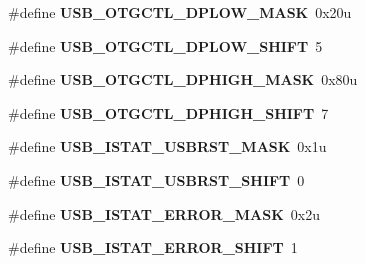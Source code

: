 \begin{DoxyCompactItemize}
\item 
\#define {\bfseries U\+S\+B\+\_\+\+O\+T\+G\+C\+T\+L\+\_\+\+D\+P\+L\+O\+W\+\_\+\+M\+A\+SK}~0x20u\hypertarget{group__USB__Register__Masks_gad6a988a0338aa5fcd511f9644b2375eb}{}\label{group__USB__Register__Masks_gad6a988a0338aa5fcd511f9644b2375eb}

\item 
\#define {\bfseries U\+S\+B\+\_\+\+O\+T\+G\+C\+T\+L\+\_\+\+D\+P\+L\+O\+W\+\_\+\+S\+H\+I\+FT}~5\hypertarget{group__USB__Register__Masks_ga94318731712f5399af57fefe46ac8cec}{}\label{group__USB__Register__Masks_ga94318731712f5399af57fefe46ac8cec}

\item 
\#define {\bfseries U\+S\+B\+\_\+\+O\+T\+G\+C\+T\+L\+\_\+\+D\+P\+H\+I\+G\+H\+\_\+\+M\+A\+SK}~0x80u\hypertarget{group__USB__Register__Masks_ga58ba9522df4e9a18c7efa0472837c30c}{}\label{group__USB__Register__Masks_ga58ba9522df4e9a18c7efa0472837c30c}

\item 
\#define {\bfseries U\+S\+B\+\_\+\+O\+T\+G\+C\+T\+L\+\_\+\+D\+P\+H\+I\+G\+H\+\_\+\+S\+H\+I\+FT}~7\hypertarget{group__USB__Register__Masks_ga898efaea515cbbb64826b7685082665f}{}\label{group__USB__Register__Masks_ga898efaea515cbbb64826b7685082665f}

\item 
\#define {\bfseries U\+S\+B\+\_\+\+I\+S\+T\+A\+T\+\_\+\+U\+S\+B\+R\+S\+T\+\_\+\+M\+A\+SK}~0x1u\hypertarget{group__USB__Register__Masks_gaacafc35a1c208555b284f9f086708686}{}\label{group__USB__Register__Masks_gaacafc35a1c208555b284f9f086708686}

\item 
\#define {\bfseries U\+S\+B\+\_\+\+I\+S\+T\+A\+T\+\_\+\+U\+S\+B\+R\+S\+T\+\_\+\+S\+H\+I\+FT}~0\hypertarget{group__USB__Register__Masks_gad463e743b6bdd9589a499bf654703da0}{}\label{group__USB__Register__Masks_gad463e743b6bdd9589a499bf654703da0}

\item 
\#define {\bfseries U\+S\+B\+\_\+\+I\+S\+T\+A\+T\+\_\+\+E\+R\+R\+O\+R\+\_\+\+M\+A\+SK}~0x2u\hypertarget{group__USB__Register__Masks_gaef490eac989ee78a88372bcbf3b029c6}{}\label{group__USB__Register__Masks_gaef490eac989ee78a88372bcbf3b029c6}

\item 
\#define {\bfseries U\+S\+B\+\_\+\+I\+S\+T\+A\+T\+\_\+\+E\+R\+R\+O\+R\+\_\+\+S\+H\+I\+FT}~1\hypertarget{group__USB__Register__Masks_gaa4afff6c8a78b6b44f3e314dd4746892}{}\label{group__USB__Register__Masks_gaa4afff6c8a78b6b44f3e314dd4746892}


\end{DoxyCompactItemize}
